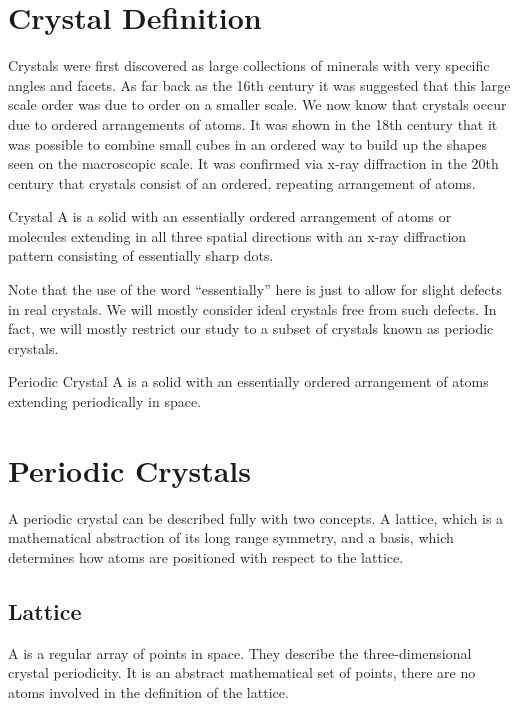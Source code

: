 \documentclass[fleqn]{NotesClass}
\begin{document}
    \section{Crystal Definition}
    Crystals were first discovered as large collections of minerals with very specific angles and facets.
    As far back as the 16th century it was suggested that this large scale order was due to order on a smaller scale.
    We now know that crystals occur due to ordered arrangements of atoms.
    It was shown in the 18th century that it was possible to combine small cubes in an ordered way to build up the shapes seen on the macroscopic scale.
    It was confirmed via x-ray diffraction in the 20th century that crystals consist of an ordered, repeating arrangement of atoms.
    
    \begin{dfn}{Crystal}{}
        A  is a solid with an essentially ordered arrangement of atoms or molecules extending in all three spatial directions with an x-ray diffraction pattern consisting of essentially sharp dots.
    \end{dfn}
    Note that the use of the word \enquote{essentially} here is just to allow for slight defects in real crystals.
    We will mostly consider ideal crystals free from such defects.
    In fact, we will mostly restrict our study to a subset of crystals known as periodic crystals.
    
    \begin{dfn}{Periodic Crystal}{}
        A  is a solid with an essentially ordered arrangement of atoms extending periodically in space.
    \end{dfn}

    \section{Periodic Crystals}
    A periodic crystal can be described fully with two concepts.
    A lattice, which is a mathematical abstraction of its long range symmetry, and a basis, which determines how atoms are positioned with respect to the lattice.
    
    \subsection{Lattice}
    A  is a regular array of points in space.
    They describe the three-dimensional crystal periodicity.
    It is an abstract mathematical set of points, there are no atoms involved in the definition of the lattice.
    
\end{document}
